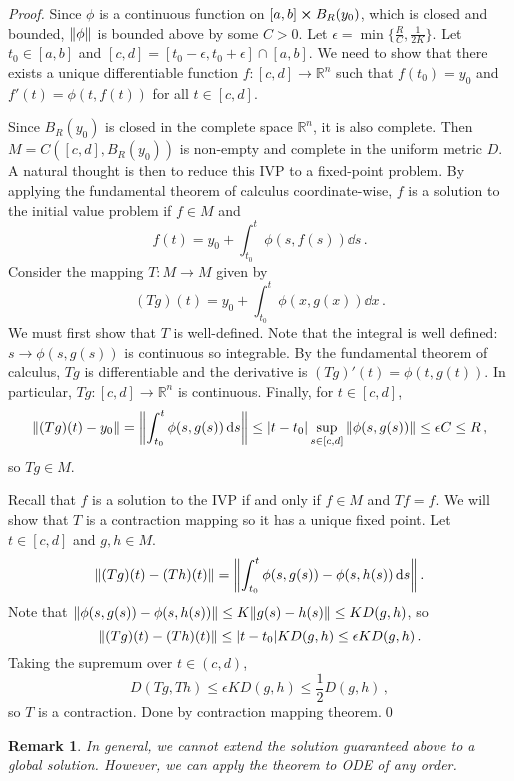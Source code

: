 \documentclass{article}
\theoremstyle{plain}\theoremheaderfont{\normalfont\itshape}\theorembodyfont{\rmfamily}\theoremseparator{.}\newtheorem*{rem}{Remark}\newtheorem*{ex}{Example}\newtheorem*{proof}{Proof}\newtheorem*{altp}{Alternative proof}
\theoremstyle{plain}\theoremheaderfont{\normalfont\bfseries}\theorembodyfont{\rmfamily}\theoremseparator{.}\newtheorem{thm}{Theorem}[section]\newtheorem{lem}[thm]{Lemma}\newtheorem{prop}[thm]{Proposition}\newtheorem*{cor}{Corollary}\newtheorem{defn}[thm]{Definition}\newtheorem{clm}[thm]{Claim}\newtheorem{clminproof}{Claim}
\theoremstyle{break}\theoremheaderfont{\normalfont\itshape}\theorembodyfont{\rmfamily}\theoremseparator{.\medskip}\newtheorem*{proofskip}{Proof}\newtheorem*{exs}{Examples}\newtheorem*{rems}{Remarks}
\theoremstyle{break}\theoremheaderfont{\normalfont\bfseries}\theorembodyfont{\rmfamily}\theoremseparator{.\medskip}\newtheorem{lemskip}[thm]{Lemma}\newtheorem{defnskip}[thm]{Definition}\newtheorem{propskip}[thm]{Proposition}\newtheorem{thmskip}[thm]{Theorem}
\newcommand{\qed}{\hfill\ensuremath{\Box}}
\begin{document}
    \begin{proof}
        Since \(\phi\) is a continuous function on \([a,b]\cross B_R(y_0)\), which is closed and bounded, \(\norm{\phi}\) is bounded above by some \(C>0\). Let \(\epsilon=\min\{\frac{R}{C},\frac{1}{2K}\}\). Let \(t_0\in[a,b]\) and \([c,d]=[t_0-\epsilon,t_0+\epsilon]\cap [a,b]\). We need to show that there exists a unique differentiable function \(f:[c,d]\to\mathbb{R}^n\) such that \(f(t_0)=y_0\) and \(f'(t)=\phi(t,f(t))\) for all \(t\in[c,d]\).

        Since \(B_R(y_0)\) is closed in the complete space \(\mathbb{R}^n\), it is also complete. Then \(M=C([c,d],B_R(y_0))\) is non-empty and complete in the uniform metric \(D\). A natural thought is then to reduce this IVP to a fixed-point problem. By applying the fundamental theorem of calculus coordinate-wise, \(f\) is a solution to the initial value problem if \(f\in M\) and
        \[f(t)=y_0+\int_{t_0}^{t}\phi(s,f(s))\dd{s}\,.\]
        Consider the mapping \(T:M\to M\) given by
        \[(Tg)(t)=y_0+\int_{t_0}^{t}\phi(x,g(x))\dd{x}\,.\]
        We must first show that \(T\) is well-defined. Note that the integral is well defined: \(s\to\phi(s,g(s))\) is continuous so integrable. By the fundamental theorem of calculus, \(Tg\) is differentiable and the derivative is \((Tg)'(t)=\phi(t,g(t))\). In particular, \(Tg:[c,d]\to\mathbb{R}^n\) is continuous. Finally, for \(t\in[c,d]\),
        \[\norm{(Tg)(t)-y_0}=\norm{\int_{t_0}^{t}\phi(s,g(s))\dd{s}}\le\abs{t-t_0}\sup_{s\in[c,d]}\norm{\phi(s,g(s))}\le\epsilon C\le R\,,\]
        so \(Tg\in M\).
        
        Recall that \(f\) is a solution to the IVP if and only if \(f\in M\) and \(Tf=f\). We will show that \(T\) is a contraction mapping so it has a unique fixed point. Let \(t\in[c,d]\) and \(g,h\in M\).
        \[\norm{(Tg)(t)-(Th)(t)}=\norm{\int_{t_0}^{t}\phi(s,g(s))-\phi(s,h(s))\dd{s}}\,.\]
        Note that \(\norm{\phi(s,g(s))-\phi(s,h(s))}\le K\norm{g(s)-h(s)}\le KD(g,h)\), so
        \[\norm{(Tg)(t)-(Th)(t)}\le\abs{t-t_0}KD(g,h)\le\epsilon KD(g,h)\,.\]
        Taking the supremum over \(t\in(c,d)\),
        \[D(Tg,Th)\le\epsilon KD(g,h)\le\frac{1}{2}D(g,h)\,,\]
        so \(T\) is a contraction. Done by contraction mapping theorem.\qed
    \end{proof}
    \begin{rem}
        In general, we cannot extend the solution guaranteed above to a global solution. However, we can apply the theorem to ODE of any order.
    \end{rem}
    \newpage
\end{document}
